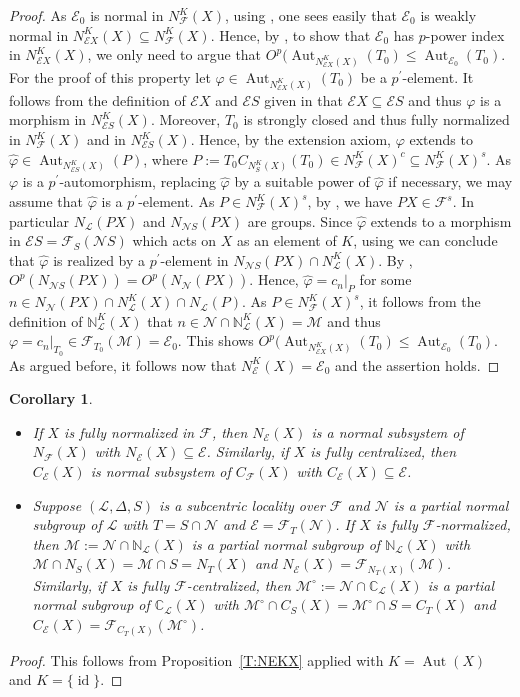 \documentclass[reqno,11pt]{amsart}
\numberwithin{equation}{section}
\newtheorem{cor}[equation]{Corollary}
\theoremstyle{definition}
\newcommand{\bN}{\mathbb{N}}
\newcommand{\bC}{\mathbb{C}}
\newcommand{\F}{\mathcal{F}}
\newcommand{\E}{\mathcal{E}}
\renewcommand{\L}{\mathcal{L}}
\newcommand{\M}{\mathcal{M}}
\newcommand{\N}{\mathcal{N}}
\newcommand{\Aut}{\operatorname{Aut}}
\newcommand{\id}{\operatorname{id}}
\renewcommand{\phi}{\varphi}
\begin{document}
\begin{proof}
As $\E_0$ is normal in $N_\F^K(X)$, using \cite[Proposition~I.6.4]{Aschbacher/Kessar/Oliver:2011}, one sees easily that $\E_0$ is weakly normal in $N_{\E X}^K(X)\subseteq N_\F^K(X)$. Hence, by \cite[Lemma~4.1]{Henke/Lynd:2017}, to show that $\E_0$ has $p$-power index in $N_{\E X}^K(X)$, we only need to argue that $O^p(\Aut_{N_{\E X}^K(X)}(T_0)\leq \Aut_{\E_0}(T_0)$. For the proof of this property let $\phi\in\Aut_{N_{\E X}^K(X)}(T_0)$ be a $p^\prime$-element. It follows from the definition of $\E X$ and $\E S$ given in \cite[Definition~1]{Henke:2013} that $\E X\subseteq \E S$ and thus $\phi$ is a morphism in $N_{\E S}^K(X)$. Moreover, $T_0$ is strongly closed and thus fully normalized in $N_\F^K(X)$ and in $N_{\E S}^K(X)$. Hence, by the extension axiom, $\phi$ extends to $\hat{\phi}\in\Aut_{N_{\E S}^K(X)}(P)$, where $P:=T_0C_{N_S^K(X)}(T_0)\in N_\F^K(X)^c\subseteq N_\F^K(X)^s$. As $\phi$ is a $p^\prime$-automorphism, replacing $\hat{\phi}$ by a suitable power of $\hat{\phi}$ if necessary, we may assume that $\hat{\phi}$ is a $p^\prime$-element. As $P\in N_\F^K(X)^s$, by \cite[Lemma~3.14]{Henke:2015}, we have $PX\in\F^s$. In particular $N_\L(PX)$ and $N_{\N S}(PX)$ are groups. Since $\hat{\phi}$ extends to a morphism in $\E S=\F_S(\N S)$ which acts on $X$ as an element of $K$, using \cite[Lemma~2.3(c)]{Chermak:2015} we can conclude that $\hat{\phi}$ is realized by a $p^\prime$-element in $N_{\N S}(PX)\cap N_\L^K(X)$. By \cite[Lemma~6.1(b)]{Henke:2020}, $O^p(N_{\N S}(PX))=O^p(N_\N(PX))$. Hence, $\hat{\phi}=c_n|_P$ for some $n\in N_\N(PX)\cap N_\L^K(X)\cap N_\L(P)$. As $P\in N_\F^K(X)^s$, it follows from the definition of $\bN_\L^K(X)$ that $n\in \N\cap \bN_\L^K(X)=\M$ and thus $\phi=c_n|_{T_0}\in \F_{T_0}(\M)=\E_0$. This shows $O^p(\Aut_{N_{\E X}^K(X)}(T_0)\leq \Aut_{\E_0}(T_0)$. As argued before, it follows now that $N_\E^K(X)=\E_0$ and the assertion holds.
\end{proof}


\begin{cor}\label{C:NEXCEX}
\begin{itemize}
 \item [(a)] If $X$ is fully normalized in $\F$, then $N_\E(X)$ is a normal subsystem of $N_\F(X)$ with $N_\E(X)\subseteq \E$. Similarly, if $X$ is fully centralized, then $C_\E(X)$ is normal subsystem of $C_\F(X)$ with $C_\E(X)\subseteq \E$.
\item [(b)] Suppose $(\L,\Delta,S)$ is a subcentric locality over $\F$ and $\N$ is a partial normal subgroup of $\L$ with $T=S\cap \N$ and $\E=\F_T(\N)$. If $X$ is fully $\F$-normalized, then $\M:={\N\cap \bN_\L(X)}$ is a partial normal subgroup of $\bN_\L(X)$ with $\M\cap N_S(X)=\M\cap S=N_T(X)$ and $N_\E(X)=\F_{N_T(X)}(\M)$. Similarly, if $X$ is fully $\F$-centralized, then $\M^\circ:=\N\cap \bC_\L(X)$ is a partial normal subgroup of $\bC_\L(X)$ with $\M^\circ\cap C_S(X)=\M^\circ\cap S=C_T(X)$ and $C_\E(X)=\F_{C_T(X)}(\M^\circ)$. 
\end{itemize}
\end{cor}


\begin{proof}
 This follows from Proposition~\ref{T:NEKX} applied with $K=\Aut(X)$ and $K=\{\id\}$. 
\end{proof}










\end{document}
